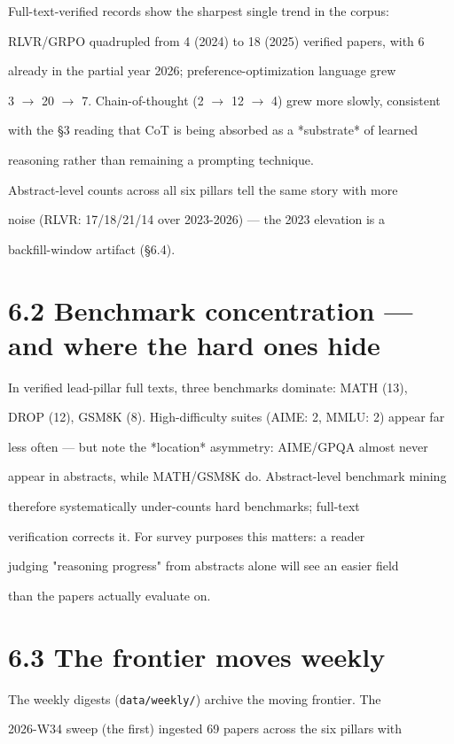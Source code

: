 \documentclass[11pt]{article}
\begin{document}
Full-text-verified records show the sharpest single trend in the corpus:

RLVR/GRPO quadrupled from 4 (2024) to 18 (2025) verified papers, with 6

already in the partial year 2026; preference-optimization language grew

3 $\rightarrow$ 20 $\rightarrow$ 7. Chain-of-thought (2 $\rightarrow$ 12 $\rightarrow$ 4) grew more slowly, consistent

with the \S3 reading that CoT is being absorbed as a *substrate* of learned

reasoning rather than remaining a prompting technique.


Abstract-level counts across all six pillars tell the same story with more

noise (RLVR: 17/18/21/14 over 2023-2026) --- the 2023 elevation is a

backfill-window artifact (\S6.4).


\section{6.2 Benchmark concentration --- and where the hard ones hide}

In verified lead-pillar full texts, three benchmarks dominate: MATH (13),

DROP (12), GSM8K (8). High-difficulty suites (AIME: 2, MMLU: 2) appear far

less often --- but note the *location* asymmetry: AIME/GPQA almost never

appear in abstracts, while MATH/GSM8K do. Abstract-level benchmark mining

therefore systematically under-counts hard benchmarks; full-text

verification corrects it. For survey purposes this matters: a reader

judging "reasoning progress" from abstracts alone will see an easier field

than the papers actually evaluate on.


\section{6.3 The frontier moves weekly}

The weekly digests (\texttt{data/weekly/}) archive the moving frontier. The

2026-W34 sweep (the first) ingested 69 papers across the six pillars with
\end{document}
